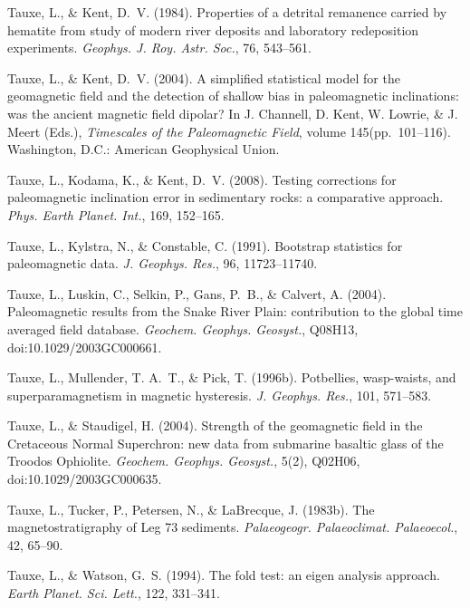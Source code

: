 \documentclass[,plain]{tauxe}
\begin{document}
\begin{thebibliography}{}
\bibitem{}%
Tauxe, L., \& Kent, D.~V. (1984).
Properties of a detrital remanence carried by hematite from study of modern river deposits and laboratory redeposition experiments.
{\it Geophys. J. Roy. Astr. Soc.}, 76, 543--561.

\bibitem{}%
Tauxe, L., \& Kent, D.~V. (2004).
A simplified statistical model for the geomagnetic field and the detection of shallow bias in paleomagnetic inclinations: was the ancient magnetic field dipolar?
In J. Channell, D. Kent, W. Lowrie, \& J. Meert (Eds.), {\it Timescales of the Paleomagnetic Field}, volume 145\break (pp.\ 101--116). Washington, D.C.: American Geophysical Union.

\bibitem{}%
Tauxe, L., Kodama, K., \& Kent, D.~V. (2008).
Testing corrections for paleomagnetic inclination error in sedimentary rocks: a comparative approach.
{\it Phys. Earth Planet. Int.}, 169, 152--165.

\bibitem{}%
Tauxe, L., Kylstra, N., \& Constable, C. (1991).
Bootstrap statistics for paleomagnetic data.
{\it J. Geophys. Res.}, 96, 11723--11740.

\bibitem{}%
Tauxe, L., Luskin, C., Selkin, P., Gans, P.~B., \& Calvert, A. (2004).
Paleomagnetic results from the Snake River Plain: contribution to the global time averaged field database.
{\it Geochem. Geophys. Geosyst.}, Q08H13, doi:10.1029/2003GC000661.

\bibitem{}%
Tauxe, L., Mullender, T. A.~T., \& Pick, T. (1996b).
Potbellies, wasp-waists, and superparamagnetism in magnetic hysteresis.
{\it J. Geophys. Res.}, 101, 571--583.

\bibitem{}%
Tauxe, L., \& Staudigel, H. (2004).
Strength of the geomagnetic field in the Cretaceous Normal Superchron: new data from submarine basaltic glass of the Troodos Ophiolite.
{\it Geochem. Geophys. Geosyst.}, 5(2), Q02H06, doi:10.1029/2003GC000635.

\bibitem{}%
Tauxe, L., Tucker, P., Petersen, N., \& LaBrecque, J. (1983b).
The magnetostratigraphy of Leg 73 sediments.
{\it Palaeogeogr. Palaeoclimat. Palaeoecol.}, 42, 65--90.

\bibitem{}%
Tauxe, L., \& Watson, G.~S. (1994).
The fold test: an eigen analysis approach.
{\it Earth Planet. Sci. Lett.}, 122, 331--341.


\end{thebibliography}
\end{document}

